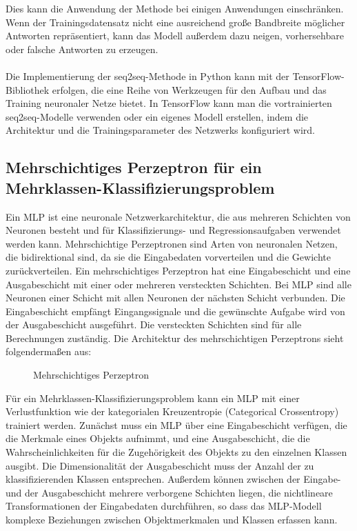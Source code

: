 Dies kann die Anwendung der Methode bei einigen Anwendungen einschränken. 
Wenn der Trainingsdatensatz nicht eine ausreichend große Bandbreite möglicher Antworten repräsentiert, kann das Modell außerdem dazu neigen, vorhersehbare oder falsche Antworten zu erzeugen.\\\\
Die Implementierung der seq2seq-Methode in Python kann mit der TensorFlow-Bibliothek erfolgen, die eine Reihe von Werkzeugen für den Aufbau und das Training neuronaler Netze bietet. 
In TensorFlow kann man die vortrainierten seq2seq-Modelle verwenden oder ein eigenes Modell erstellen, indem die Architektur und die Trainingsparameter des Netzwerks konfiguriert wird. \cite{tensorflow}
\subsection{Mehrschichtiges Perzeptron für ein Mehrklassen-Klassifizierungsproblem}
Ein \ac{MLP} ist eine neuronale Netzwerkarchitektur, die aus mehreren Schichten von Neuronen besteht und für Klassifizierungs- und Regressionsaufgaben verwendet werden kann. 
Mehrschichtige Perzeptronen sind Arten von neuronalen Netzen, die bidirektional sind, da sie die Eingabedaten vorverteilen und die Gewichte zurückverteilen. 
Ein mehrschichtiges Perzeptron hat eine Eingabeschicht und eine Ausgabeschicht mit einer oder mehreren versteckten Schichten. 
Bei \ac{MLP} sind alle Neuronen einer Schicht mit allen Neuronen der nächsten Schicht verbunden. 
Die Eingabeschicht empfängt Eingangssignale und die gewünschte Aufgabe wird von der Ausgabeschicht ausgeführt. 
Die versteckten Schichten sind für alle Berechnungen zuständig. 
Die Architektur des mehrschichtigen Perzeptrons sieht folgendermaßen aus:
\begin{figure}[H]
    \centering
    \caption{\label{figure:Mehrschichtiges_Perzeptron}Mehrschichtiges Perzeptron}
\end{figure}
\noindent
Für ein Mehrklassen-Klassifizierungsproblem kann ein \ac{MLP} mit einer Verlustfunktion wie der kategorialen Kreuzentropie (Categorical Crossentropy) trainiert werden. 
Zunächst muss ein \ac{MLP} über eine Eingabeschicht verfügen, die die Merkmale eines Objekts aufnimmt, und eine Ausgabeschicht, die die Wahrscheinlichkeiten für die Zugehörigkeit des Objekts zu den einzelnen Klassen ausgibt. 
Die Dimensionalität der Ausgabeschicht muss der Anzahl der zu klassifizierenden Klassen entsprechen.
Außerdem können zwischen der Eingabe- und der Ausgabeschicht mehrere verborgene Schichten liegen, die nichtlineare Transformationen der Eingabedaten durchführen, so dass das \ac{MLP}-Modell komplexe Beziehungen zwischen Objektmerkmalen und Klassen erfassen kann. 
